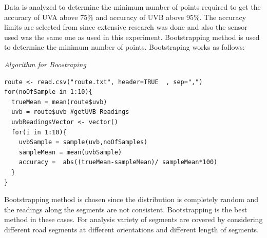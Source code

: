 \documentclass[12pt,fullpage,doublespace]{article}
\begin{document}
Data is analyzed to determine the minimum number of points required to get the accuracy of UVA above 75\% and accuracy of UVB above 95\%. The accuracy limits are selected from \cite{uvguardian} since extensive research was done and also the sensor used was the same one as used in this experiment. Bootstrapping method is used to determine the minimum number of points. Bootstraping works as follows:
\\
\begin{center}
{ 	

\begin{center} 
{\small \sl Algorithm for Boostraping \\}
\end{center} 
}
\end{center}
\newpage
\lstset{caption=R Code for Bootstraping,breaklines=true, tabsize=4, frame=single}
\begin{lstlisting}
route <- read.csv("route.txt", header=TRUE  , sep=",")
for(noOfSample in 1:10){  
  trueMean = mean(route$uvb)
  uvb = route$uvb #getUVB Readings
  uvbReadingsVector <- vector()
  for(i in 1:10){
    uvbSample = sample(uvb,noOfSamples)
    sampleMean = mean(uvbSample)
    accuracy =  abs((trueMean-sampleMean)/ sampleMean*100)
  }
}\end{lstlisting}

Bootstrapping method is chosen since the distribution is completely random and the readings along the segments are not consistent. Bootstrapping is the best method in these cases. For analysis variety of segments are covered by considering different road segments at different orientations and different length of segments. 
\end{document}

